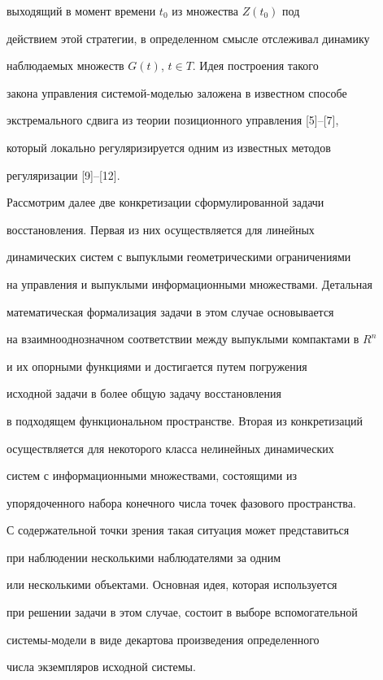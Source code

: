 выходящий в момент времени $t_0$ из множества $Z(t_0)$ под 


действием этой стратегии, в определенном смысле отслеживал динамику 


наблюдаемых множеств $G(t)$, $t\in T$. Идея построения такого 


закона управления системой-моделью заложена в известном способе 


экстремального сдвига из теории позиционного управления [5]--[7], 


который локально регуляризируется одним из известных методов 


регуляризации [9]--[12]. 


 


Рассмотрим далее две конкретизации сформулированной задачи 


восстановления. Первая из них осуществляется для линейных 


динамических систем с выпуклыми геометрическими ограничениями 


на управления и выпуклыми информационными множествами. Детальная 


математическая формализация задачи в этом случае основывается 


на взаимнооднозначном соответствии между выпуклыми компактами в $R^n$ 


и их опорными функциями и достигается путем погружения 


исходной задачи в более общую задачу восстановления 


в подходящем функциональном пространстве. Вторая из конкретизаций 


осуществляется для некоторого класса нелинейных динамических 


систем с информационными множествами, состоящими из 


упорядоченного набора конечного числа точек фазового пространства. 


С содержательной точки зрения такая ситуация может представиться 


при наблюдении несколькими наблюдателями за одним 


или несколькими объектами. Основная идея, которая используется 


при решении задачи в этом случае, состоит в выборе вспомогательной 


системы-модели в виде декартова произведения определенного 


числа экземпляров исходной системы. 


